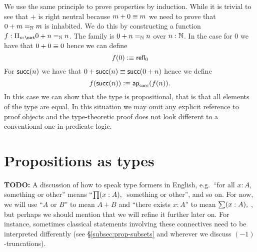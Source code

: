 We use the same principle to prove properties by induction. While it
is trivial to see that $+$ is right neutral because $m + 0 \equiv m$
we need to prove that $0 + m =_\mathbb{N} m$ is inhabited. We do this by
constructing a function $f : \Pi_{n : \nat} 0 + n =_\Nat n$. 
The family is $0 + n =_\mathbb{N} n$ over $n : \mathbb{N}$. In the case
for $0$ we have that $0 + 0 \equiv 0$ hence we can define
\[ f(0) \vcentcolon\equiv \mathsf{refl}_{0} \]
For $\mathsf{succ}(n)$ we have that $0 + \mathsf{succ}(n) \equiv \mathsf{succ}(0 +
n)$ hence we define 
\[ f(\mathsf{succ}(n)) \vcentcolon\equiv \mathsf{ap}_{\mathsf{succ}}(f(n)). \]
In this case we can show that the type is propositional, that is that
all elements of the type are equal. In this situation we may omit any
explicit reference to proof objects and the type-theoretic proof does
not look different to a conventional one in predicate logic. 

\section{Propositions as types}
\label{sec:pat}

\textbf{TODO:} A discussion of how to speak type formers in English, e.g.\ ``for all $x:A$, something or other'' means ``$\prd{x:A}$ something or other'', and so on.
For now, we will use ``$A$ or $B$'' to mean $A+B$ and ``there exists $x:A$'' to mean $\sm{x:A}$, but perhaps we should mention that we will refine it further later on.
For instance, sometimes classical statements involving these connectives need to be interpreted differently (see \S\ref{subsec:prop-subsets} and wherever we discuss $(-1)$-truncations).



